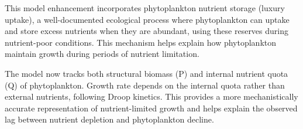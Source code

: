 This model enhancement incorporates phytoplankton nutrient storage (luxury uptake), a well-documented ecological process where phytoplankton can uptake and store excess nutrients when they are abundant, using these reserves during nutrient-poor conditions. This mechanism helps explain how phytoplankton maintain growth during periods of nutrient limitation.

The model now tracks both structural biomass (P) and internal nutrient quota (Q) of phytoplankton. Growth rate depends on the internal quota rather than external nutrients, following Droop kinetics. This provides a more mechanistically accurate representation of nutrient-limited growth and helps explain the observed lag between nutrient depletion and phytoplankton decline.
